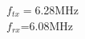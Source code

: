 \documentclass[preview]{standalone}
\begin{document}
\begin{center}
$f_{tx}=$6.28MHz\\$f_{rx}$=6.08MHz
\end{center}
\end{document}
